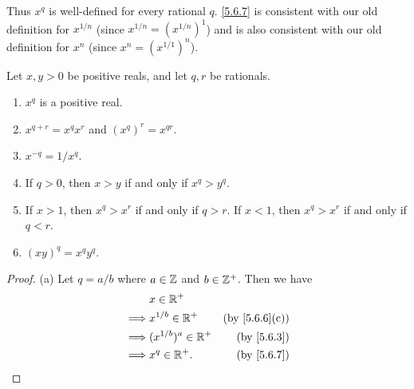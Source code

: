 \begin{note}
  Thus \(x^q\) is well-defined for every rational \(q\).
  \cref{5.6.7} is consistent with our old definition for \(x^{1 / n}\) (since \(x^{1 / n} = (x^{1 / n})^1\)) and is also consistent with our old definition for \(x^n\) (since \(x^n = (x^{1 / 1})^n\)).
\end{note}

\begin{lem}\label{5.6.9}
  Let \(x, y > 0\) be positive reals, and let \(q, r\) be rationals.
  \begin{enumerate}
    \item \(x^q\) is a positive real.
    \item \(x^{q + r} = x^q x^r\) and \((x^q)^r = x^{qr}\).
    \item \(x^{-q} = 1 / x^q\).
    \item If \(q > 0\), then \(x > y\) if and only if \(x^q > y^q\).
    \item If \(x > 1\), then \(x^q > x^r\) if and only if \(q > r\).
          If \(x < 1\), then \(x^q > x^r\) if and only if \(q < r\).
    \item \((xy)^q = x^q y^q\).
  \end{enumerate}
\end{lem}

\begin{proof}{(a)}
  Let \(q = a / b\) where \(a \in \mathbb{Z}\) and \(b \in \mathbb{Z}^+\).
  Then we have
  \begin{align*}
             & x \in \R^+                                           \\
    \implies & x^{1 / b} \in \R^+     & \text{(by \cref{5.6.6}(c))} \\
    \implies & (x^{1 / b})^a \in \R^+ & \text{(by \cref{5.6.3})}    \\
    \implies & x^q \in \R^+.          & \text{(by \cref{5.6.7})}
  \end{align*}
\end{proof}

